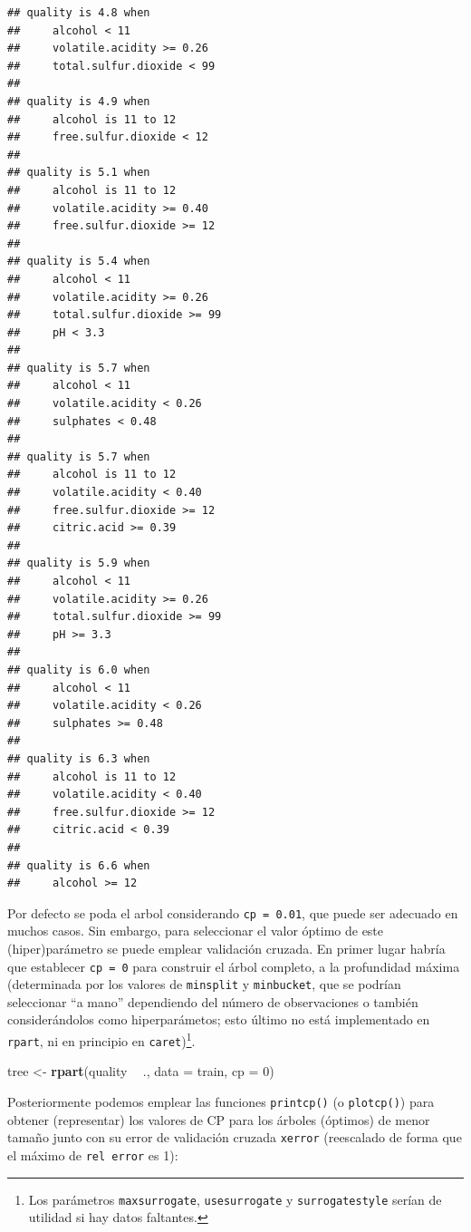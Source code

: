 \documentclass[]{book}
\newenvironment{Shaded}{\begin{snugshade}}{\end{snugshade}}
\newcommand{\KeywordTok}[1]{\textcolor[rgb]{0.13,0.29,0.53}{\textbf{#1}}}
\newcommand{\DataTypeTok}[1]{\textcolor[rgb]{0.13,0.29,0.53}{#1}}
\newcommand{\DecValTok}[1]{\textcolor[rgb]{0.00,0.00,0.81}{#1}}
\newcommand{\StringTok}[1]{\textcolor[rgb]{0.31,0.60,0.02}{#1}}
\newcommand{\OperatorTok}[1]{\textcolor[rgb]{0.81,0.36,0.00}{\textbf{#1}}}
\newcommand{\NormalTok}[1]{#1}
\theoremstyle{break}
\theoremstyle{definition}
\theoremstyle{definition}
\theoremstyle{definition}
\theoremstyle{remark}
\begin{document}
\begin{verbatim}
## quality is 4.8 when
##     alcohol < 11
##     volatile.acidity >= 0.26
##     total.sulfur.dioxide < 99
## 
## quality is 4.9 when
##     alcohol is 11 to 12
##     free.sulfur.dioxide < 12
## 
## quality is 5.1 when
##     alcohol is 11 to 12
##     volatile.acidity >= 0.40
##     free.sulfur.dioxide >= 12
## 
## quality is 5.4 when
##     alcohol < 11
##     volatile.acidity >= 0.26
##     total.sulfur.dioxide >= 99
##     pH < 3.3
## 
## quality is 5.7 when
##     alcohol < 11
##     volatile.acidity < 0.26
##     sulphates < 0.48
## 
## quality is 5.7 when
##     alcohol is 11 to 12
##     volatile.acidity < 0.40
##     free.sulfur.dioxide >= 12
##     citric.acid >= 0.39
## 
## quality is 5.9 when
##     alcohol < 11
##     volatile.acidity >= 0.26
##     total.sulfur.dioxide >= 99
##     pH >= 3.3
## 
## quality is 6.0 when
##     alcohol < 11
##     volatile.acidity < 0.26
##     sulphates >= 0.48
## 
## quality is 6.3 when
##     alcohol is 11 to 12
##     volatile.acidity < 0.40
##     free.sulfur.dioxide >= 12
##     citric.acid < 0.39
## 
## quality is 6.6 when
##     alcohol >= 12
\end{verbatim}

Por defecto se poda el arbol considerando \texttt{cp\ =\ 0.01}, que
puede ser adecuado en muchos casos. Sin embargo, para seleccionar el
valor óptimo de este (hiper)parámetro se puede emplear validación
cruzada. En primer lugar habría que establecer \texttt{cp\ =\ 0} para
construir el árbol completo, a la profundidad máxima (determinada por
los valores de \texttt{minsplit} y \texttt{minbucket}, que se podrían
seleccionar ``a mano'' dependiendo del número de observaciones o también
considerándolos como hiperparámetos; esto último no está implementado en
\texttt{rpart}, ni en principio en \texttt{caret})\footnote{Los
  parámetros \texttt{maxsurrogate}, \texttt{usesurrogate} y
  \texttt{surrogatestyle} serían de utilidad si hay datos faltantes.}.

\begin{Shaded}
\begin{Highlighting}[]
\NormalTok{tree <-}\StringTok{ }\KeywordTok{rpart}\NormalTok{(quality }\OperatorTok{~}\StringTok{ }\NormalTok{., }\DataTypeTok{data =}\NormalTok{ train, }\DataTypeTok{cp =} \DecValTok{0}\NormalTok{)}
\end{Highlighting}
\end{Shaded}

Posteriormente podemos emplear las funciones \texttt{printcp()} (o
\texttt{plotcp()}) para obtener (representar) los valores de CP para los
árboles (óptimos) de menor tamaño junto con su error de validación
cruzada \texttt{xerror} (reescalado de forma que el máximo de
\texttt{rel\ error} es 1):
\end{document}
